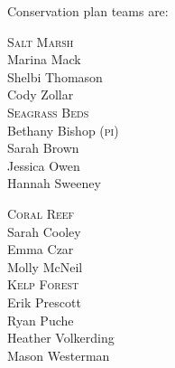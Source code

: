 \documentclass[t]{beamer}
\begin{document}
\begin{frame}[t]{Conservation plan teams are:}

\begin{multicols}{2}

\textsc{Salt Marsh}\\[1ex]
Marina Mack   \\
Shelbi Thomason \\ %
Cody Zollar  \\[2\baselineskip]

\textsc{Seagrass Beds}\\[1ex]
Bethany Bishop  (\textsc{pi})\\
Sarah Brown \\
Jessica Owen \\ %
Hannah Sweeney \\[2\baselineskip]

\columnbreak

\textsc{Coral Reef}\\[1ex]
Sarah Cooley \\%
Emma Czar \\
Molly McNeil \\[2\baselineskip]

\textsc{Kelp Forest}\\[1ex]
Erik Prescott \\
Ryan Puche \\
Heather Volkerding \\
Mason Westerman   \\[2\baselineskip]

%


\end{multicols}

\end{frame}
\end{document}
